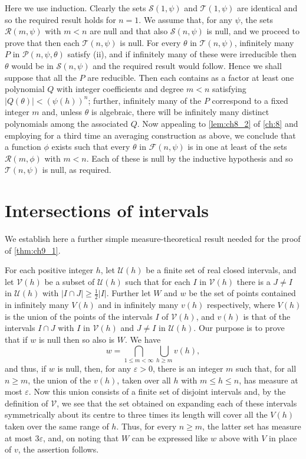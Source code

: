 Here we use induction. 
Clearly the sets $\mathscr{S}(1,\psi)$ and $\mathscr{T}(1,\psi)$ are identical and so the required result holds for $n = 1$. We assume that, for any $\psi$, the sets $\mathscr{R}(m, \psi)$ with $m < n$ are null and that also $\mathscr{S}(n, \psi)$ is null, 
and we proceed to prove that then each $\mathscr{T}(n, \psi)$ is null. 
For every $\theta$ in $\mathscr{T}(n, \psi)$, infinitely many $P$ in $\mathscr{P}(n, \psi, \theta)$ satisfy (ii), 
and if infinitely many of these were irreducible then $\theta$ would be in $\mathscr{S}(n, \psi)$ and the required result would follow. Hence we shall suppose that all the $P$ are reducible. 
Then each contains as a factor at least one polynomial $Q$ with integer coefficients and degree $m < n$ satisfying $|Q(\theta)| < (\psi(h))^n$; 
further, infinitely many of the $P$ correspond to a fixed integer $m$ and, 
unless $\theta$ is algebraic,
there will be infinitely many distinct polynomials among the associated $Q$.
Now appealing to \autoref{lem:ch8_2} of \autoref{ch:8} and employing for a third time an averaging construction as above, 
we conclude that a function $\phi$ exists such that every $\theta$ in $\mathscr{F}(n,\psi)$ is in one at least of the sets $\mathscr{R}(m,\phi)$ with $m < n$. 
Each of these is null by the inductive hypothesis and so $\mathscr{T}(n, \psi)$ is null, as required.

\section{Intersections of intervals}\label{sec:ch9_4}

We establish here a further simple measure-theoretical result needed for the proof of \autoref{thm:ch9_1}.

For each positive integer $h$, let $\mathscr{U}(h)$ be a finite set of real closed intervals, and let $\mathscr{V}(h)$ be a subset of $\mathscr{U}(h)$ such that for each $I$ in $\mathscr{V}(h)$ there is a $J \neq I$ in $\mathscr{U}(h)$ with $|I \cap J| \geq \frac{1}{2}|I|$. Further let $W$ and $w$ be the set of points contained in infinitely many $V(h)$ and in infinitely many $v(h)$ respectively, where $V(h)$ is the union of the points of the intervals $I$ of $\mathscr{V}(h)$, and $v(h)$ is that of the intervals $I \cap J$ with $I$ in $\mathscr{V}(h)$ and $J \neq I$ in $\mathscr{U}(h)$. Our purpose is to prove that if $w$ is null then so also is $W$. We have
\[w = \bigcap_{1 \leq m < \infty} \bigcup_{h \geq m} v(h),\]
and thus, if $w$ is null, then, for any $\varepsilon > 0$, there is an integer $m$ such that, for all $n \ge m$, the union of the $v(h)$, taken over all $h$ with $m \le h \le n$, has measure at most $\varepsilon$. Now this union consists of a finite set of disjoint intervals and, by the definition of $\mathscr{V}$, we see that the set obtained on expanding each of these intervals symmetrically about its centre to three times its length will cover all the $V(h)$ taken over the same range of $h$. Thus, for every $n \ge m$, the latter set has measure at most $3\varepsilon$, and, on noting that $W$ can be expressed like $w$ above with $V$ in place of $v$, the assertion follows.

